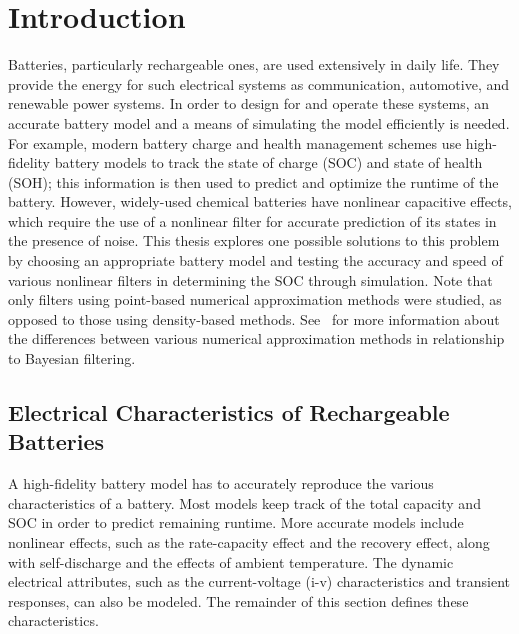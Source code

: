 \documentclass[../zhang_thesis.tex]{subfiles}
\begin{document}
\chapter{Introduction}

Batteries, particularly rechargeable ones, are used extensively in daily life. They provide the energy for such electrical systems as communication, automotive, and renewable power systems. In order to design for and operate these systems, an accurate battery model and a means of simulating the model efficiently is needed. For example, modern battery charge and health management schemes use high-fidelity battery models to track the state of charge (SOC) and state of health (SOH); this
information is then used to predict and optimize the runtime of the battery. However, widely-used chemical batteries have nonlinear capacitive effects, which require the use of a nonlinear filter for accurate prediction of its states in the presence of noise. This thesis explores one possible solutions to this problem by choosing an appropriate battery model and testing the accuracy and speed of various nonlinear filters in determining the SOC through simulation. Note that only filters
using point-based numerical approximation methods were studied, as opposed to those using density-based methods. See~\cite{chen03} for more information about the differences between various numerical approximation methods in relationship to Bayesian filtering.


\section{Electrical Characteristics of Rechargeable Batteries}
\label{sec:echar}

A high-fidelity battery model has to accurately reproduce the various characteristics of a battery. Most models keep track of the total capacity and SOC in order to predict remaining runtime. More accurate models include nonlinear effects, such as the rate-capacity effect and the recovery effect, along with self-discharge and the effects of ambient temperature. The dynamic electrical attributes, such as the current-voltage (i-v) characteristics and transient responses, can also be
modeled. The remainder of this section defines these characteristics.
\end{document}
